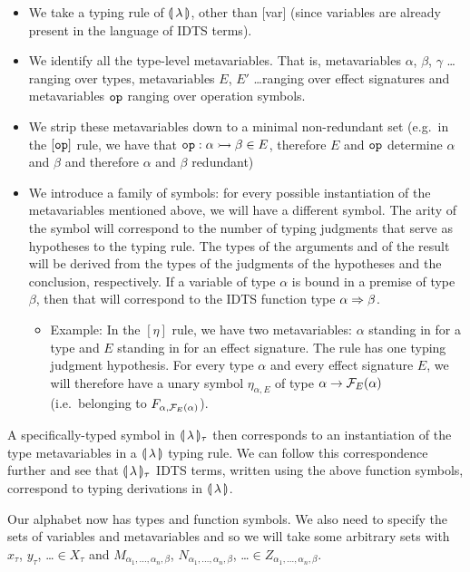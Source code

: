 \begin{itemize}
\item We take a typing rule of $\llparenthesis \, \lambda \, \rrparenthesis$, other than [var] (since
  variables are already present in the language of IDTS terms).
\item We identify all the type-level metavariables. That is, metavariables
  $\alpha$, $\beta$, $\gamma$ \ldots ranging over types, metavariables $E$,
  $E'$ \ldots ranging over effect signatures and metavariables $\mathtt{op}$
  ranging over operation symbols.
\item We strip these metavariables down to a minimal non-redundant set
  (e.g.\ in the $[\mathtt{op}]$ rule, we have that
  $\mathtt{op} : \alpha \rightarrowtail \beta \in E$, therefore $E$ and $\mathtt{op}$
  determine $\alpha$ and $\beta$ and therefore $\alpha$ and $\beta$
  redundant)
\item We introduce a family of symbols: for every possible instantiation of
  the metavariables mentioned above, we will have a different symbol. The
  arity of the symbol will correspond to the number of typing judgments
  that serve as hypotheses to the typing rule. The types of the arguments
  and of the result will be derived from the types of the judgments of the
  hypotheses and the conclusion, respectively. If a variable of type
  $\alpha$ is bound in a premise of type
  $\beta$, then that will correspond to the IDTS function type $\alpha \Rightarrow
  \beta$.
  \begin{itemize}
  \item Example: In the $[\eta]$ rule, we have two metavariables: $\alpha$
    standing in for a type and $E$ standing in for an effect signature. The
    rule has one typing judgment hypothesis. For every type $\alpha$ and
    every effect signature $E$, we will therefore have a unary symbol
    $\eta_{\alpha, E}$ of type $\alpha \to \mathcal{F}_E(\alpha)$ (i.e.\ belonging
    to $F_{\alpha, \mathcal{F}_E(\alpha)}$).
  \end{itemize}
\end{itemize}

A specifically-typed symbol in
$\llparenthesis \, \lambda \, \rrparenthesis_\tau$ then corresponds to an instantiation of the type
metavariables in a
$\llparenthesis \, \lambda \, \rrparenthesis$ typing rule. We can follow this correspondence further
and see that
$\llparenthesis \, \lambda \, \rrparenthesis_\tau$ IDTS terms, written using the above function
symbols, correspond to typing derivations in $\llparenthesis \, \lambda \, \rrparenthesis$.

Our alphabet now has types and function symbols. We also need to specify
the sets of variables and metavariables and so we will take some arbitrary
sets with $x_\tau$, $y_\tau$, \ldots $\in X_\tau$ and
$M_{\alpha_1,\ldots,\alpha_n,\beta}$, $N_{\alpha_1,\ldots,\alpha_n,\beta}$,
\ldots $\in Z_{\alpha_1,\ldots,\alpha_n,\beta}$.

